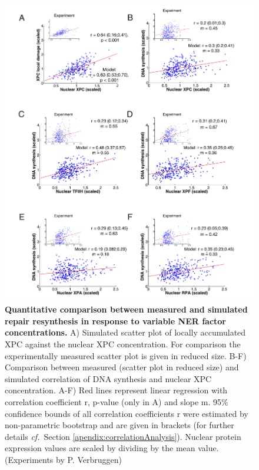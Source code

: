 \begin{figure}[htbp]
	\begin{center}
		\includegraphics[width=1\textwidth]{Abbildungen/figure3_6.pdf}
		\caption{\textbf{Quantitative comparison between measured and simulated repair resynthesis in response to variable NER factor concentrations.} A) Simulated scatter plot of locally accumulated XPC against the nuclear XPC concentration. For comparison the experimentally measured scatter plot is given in reduced size.  B-F) Comparison between measured (scatter plot in reduced size) and simulated correlation of DNA synthesis and nuclear XPC concentration. A-F) Red lines represent linear regression with correlation coefficient r, p-value (only in A) and slope m. 95\% confidence bounds of all correlation coefficients r were estimated by non-parametric bootstrap and are given in brackets (for further details \textit{cf.}\ Section \ref{apendix:correlationAnalysis}). Nuclear protein expression values are scaled by dividing by the mean value. (Experiments by P. Verbruggen)}
		\label{fig:Model_dataComp}
	\end{center}
\end{figure}

